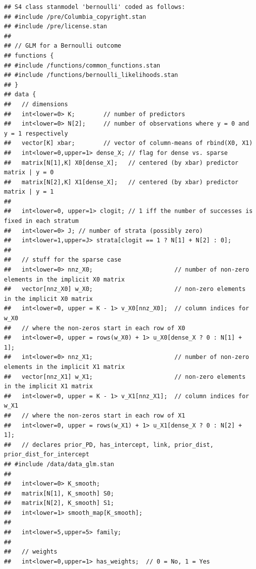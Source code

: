 \documentclass[
]{article}
\newenvironment{Shaded}{\begin{snugshade}}{\end{snugshade}}
\newcommand{\DecValTok}[1]{\textcolor[rgb]{0.00,0.00,0.81}{#1}}
\newcommand{\KeywordTok}[1]{\textcolor[rgb]{0.13,0.29,0.53}{\textbf{#1}}}
\newcommand{\NormalTok}[1]{#1}
\newcommand{\OperatorTok}[1]{\textcolor[rgb]{0.81,0.36,0.00}{\textbf{#1}}}
\begin{document}
\begin{Shaded}
\end{Shaded}

\begin{verbatim}
## S4 class stanmodel 'bernoulli' coded as follows:
## #include /pre/Columbia_copyright.stan
## #include /pre/license.stan
## 
## // GLM for a Bernoulli outcome
## functions {
## #include /functions/common_functions.stan
## #include /functions/bernoulli_likelihoods.stan
## }
## data {
##   // dimensions
##   int<lower=0> K;        // number of predictors
##   int<lower=0> N[2];     // number of observations where y = 0 and y = 1 respectively
##   vector[K] xbar;        // vector of column-means of rbind(X0, X1)
##   int<lower=0,upper=1> dense_X; // flag for dense vs. sparse
##   matrix[N[1],K] X0[dense_X];   // centered (by xbar) predictor matrix | y = 0
##   matrix[N[2],K] X1[dense_X];   // centered (by xbar) predictor matrix | y = 1
##   
##   int<lower=0, upper=1> clogit; // 1 iff the number of successes is fixed in each stratum
##   int<lower=0> J; // number of strata (possibly zero)
##   int<lower=1,upper=J> strata[clogit == 1 ? N[1] + N[2] : 0];
## 
##   // stuff for the sparse case
##   int<lower=0> nnz_X0;                       // number of non-zero elements in the implicit X0 matrix
##   vector[nnz_X0] w_X0;                       // non-zero elements in the implicit X0 matrix
##   int<lower=0, upper = K - 1> v_X0[nnz_X0];  // column indices for w_X0
##   // where the non-zeros start in each row of X0
##   int<lower=0, upper = rows(w_X0) + 1> u_X0[dense_X ? 0 : N[1] + 1]; 
##   int<lower=0> nnz_X1;                       // number of non-zero elements in the implicit X1 matrix
##   vector[nnz_X1] w_X1;                       // non-zero elements in the implicit X1 matrix
##   int<lower=0, upper = K - 1> v_X1[nnz_X1];  // column indices for w_X1
##   // where the non-zeros start in each row of X1
##   int<lower=0, upper = rows(w_X1) + 1> u_X1[dense_X ? 0 : N[2] + 1]; 
##   // declares prior_PD, has_intercept, link, prior_dist, prior_dist_for_intercept
## #include /data/data_glm.stan
## 
##   int<lower=0> K_smooth;
##   matrix[N[1], K_smooth] S0;
##   matrix[N[2], K_smooth] S1;
##   int<lower=1> smooth_map[K_smooth];
##   
##   int<lower=5,upper=5> family;
## 
##   // weights
##   int<lower=0,upper=1> has_weights;  // 0 = No, 1 = Yes

\end{verbatim}
\end{document}

